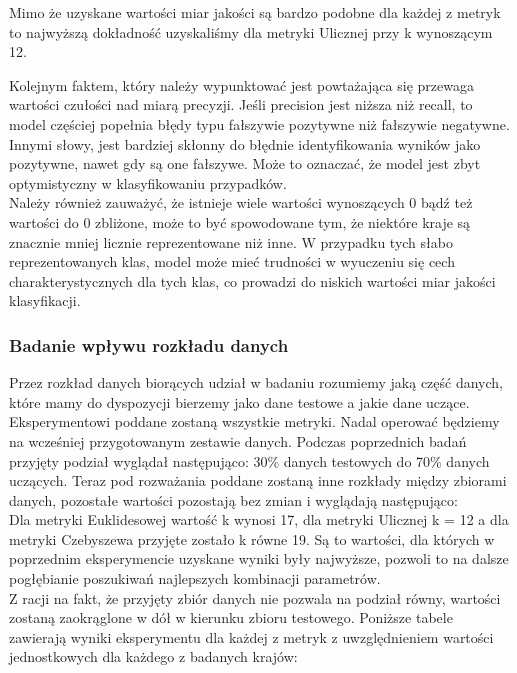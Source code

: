 \documentclass{article}
\begin{document}
\noindent Mimo że uzyskane wartości miar jakości są bardzo podobne dla każdej z metryk to najwyższą dokładność uzyskaliśmy dla metryki Ulicznej przy k wynoszącym 12. \\

\newpage

\noindent Kolejnym faktem, który należy wypunktować jest powtażająca się przewaga wartości czułości nad miarą precyzji. Jeśli precision jest niższa niż recall, to model częściej popełnia błędy typu fałszywie pozytywne niż fałszywie negatywne. Innymi słowy, jest bardziej skłonny do błędnie identyfikowania wyników jako pozytywne, nawet gdy są one fałszywe. Może to oznaczać, że model jest zbyt optymistyczny w klasyfikowaniu przypadków. \\

\noindent Należy również zauważyć, że istnieje wiele wartości wynoszących 0 bądź też wartości do 0 zbliżone, może to być spowodowane tym, że niektóre kraje są znacznie mniej licznie reprezentowane niż inne. W przypadku tych słabo reprezentowanych klas, model może mieć trudności w wyuczeniu się cech charakterystycznych dla tych klas, co prowadzi do niskich wartości miar jakości klasyfikacji.

\subsubsection*{Badanie wpływu rozkładu danych}

Przez rozkład danych biorących udział w badaniu rozumiemy jaką część danych, które mamy do dyspozycji bierzemy jako dane testowe a jakie dane uczące. Eksperymentowi poddane zostaną wszystkie metryki. Nadal operować będziemy na wcześniej przygotowanym zestawie danych. Podczas poprzednich badań przyjęty podział wyglądał następująco: 30\% danych testowych do 70\% danych uczących. Teraz pod rozważania poddane zostaną inne rozkłady między zbiorami danych, pozostałe wartości pozostają bez zmian i wyglądają następująco: \\

\noindent Dla metryki Euklidesowej wartość k wynosi 17, dla metryki Ulicznej k = 12 a dla metryki Czebyszewa przyjęte zostało k równe 19. Są to wartości, dla których w poprzednim eksperymencie uzyskane wyniki były najwyższe, pozwoli to na dalsze pogłębianie poszukiwań najlepszych kombinacji parametrów.\\

\noindent Z racji na fakt, że przyjęty zbiór danych nie pozwala na podział równy, wartości zostaną zaokrąglone w dół w kierunku zbioru testowego. Poniższe tabele zawierają wyniki eksperymentu dla każdej z metryk z uwzględnieniem wartości jednostkowych dla każdego z badanych krajów:
\end{document}
